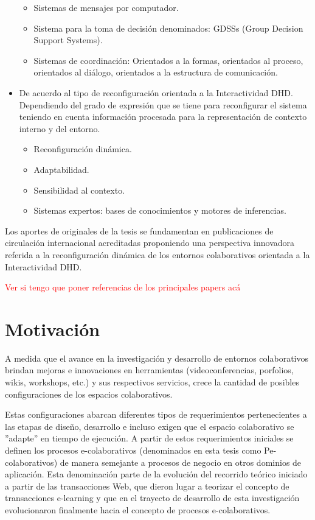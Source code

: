 \begin{itemize}
\begin{itemize}
 \item Sistemas de mensajes por computador.
 \item Sistema para la toma de decisión denominados: GDSSs (Group Decision Support Systems).
 \item Sistemas de coordinación: Orientados a la formas, orientados al proceso, orientados al diálogo, orientados a la estructura de comunicación.	
\end{itemize}

\item De acuerdo al tipo de reconfiguración orientada a la Interactividad
DHD\cite{libro.unr}. Dependiendo del grado de expresión que se tiene para
reconfigurar el sistema teniendo en cuenta información procesada
para la representación de contexto interno y del entorno.

\begin{itemize}
 \item Reconfiguración dinámica.
 \item Adaptabilidad.
 \item Sensibilidad al contexto.
 \item Sistemas expertos: bases de conocimientos y motores de inferencias.
\end{itemize}

\end{itemize}


Los aportes de originales de la tesis se fundamentan en publicaciones de circulación internacional acreditadas proponiendo una perspectiva innovadora referida a la reconfiguración dinámica de los entornos colaborativos orientada a la Interactividad DHD.

\textcolor{red}
{Ver si tengo que poner referencias de los principales papers acá}


\section{Motivación}\label{sec:motivacion}


A medida que el avance en la investigación y desarrollo de entornos colaborativos brindan mejoras e innovaciones en herramientas (videoconferencias, porfolios, wikis, workshops, etc.) y sus respectivos servicios, crece la cantidad de posibles configuraciones de los espacios colaborativos.

Estas configuraciones abarcan diferentes tipos de requerimientos pertenecientes a las  etapas de diseño, desarrollo e incluso exigen que el espacio colaborativo se ''adapte'' en tiempo de ejecución. A partir de estos requerimientos iniciales se definen los procesos e-colaborativos (denominados en esta tesis como Pe-colaborativos) \cite{cacic2007.7} de manera semejante a procesos de negocio en otros dominios de aplicación. Esta denominación parte de la evolución del recorrido teórico iniciado a partir de las transacciones Web, que dieron lugar a teorizar el concepto de transacciones e-learning \cite{cacic2007} y que en el trayecto de desarrollo de esta investigación evolucionaron finalmente hacia el concepto de procesos e-colaborativos. 


